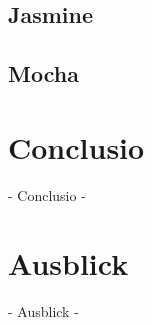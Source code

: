 \subsection{Jasmine}

\newpage
\subsection{Mocha}

\newpage
\section{Conclusio}
 - Conclusio -

\newpage
\section{Ausblick}
 - Ausblick -

\nocite{Green:2013}
\nocite{Kozlowski:2013}
\nocite{Zakas:2012}
\nocite{MacCaw:2011}
\nocite{Burnham:2011}
\nocite{Gaertner:2012}
